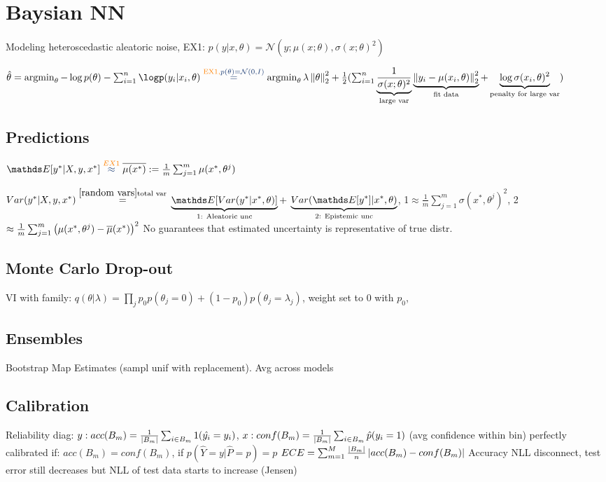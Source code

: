 \section{Baysian NN}
Modeling heteroscedastic aleatoric noise, \color{orange}EX1: $p(y|x,\theta) =
\mathcal{N}(y; \mu(x;\theta), \sigma(x; \theta)^{2})$ \color{black}

$\hat{\theta} = \argmin_\theta - \log p(\theta) - \sum_{i=1}^{n}\logp(y_{i}|x_{i},\theta)
\overset{\color{orange} \text{EX1}, \color{myblue} p(\theta)=\mathcal{N}(0,I)}{=}
\argmin_\theta \lambda \norm{\theta}_{2}^{2} +
\frac{1}{2} (\sum_{i=1}^{n} \underbrace{\frac{1}{\sigma(x;\theta)^{2}}}_{\text{large var}}
    \underbrace{\norm{y_{i}-\mu(x_{i},\theta)}^2_{2}}_{\text{fit data}}
 + \underbrace{\log \sigma(x_{i}, \theta)^{2}}_{\text{penalty for large var}})$

\subsection{Predictions}

$\E{y^{*}|X,y,x^{*}} \overset{\color{orange}EX1 \color{myblue}}{\approx}
\bar{\mu(x^{*})} := \frac{1}{m} \sum_{j=1}^{m}\mu(x^{*}, \theta^{j}) $

$Var(y^{*}|X,y,x^{*}) \overset{\ref{random vars} \text{total var}}{=}$
$\underbrace{\E {Var(y^{*}|x^{*},\theta)}}_{\text{1: Aleatoric unc}} +$
$\underbrace{Var(\E{y^{*}}|x^{*}, \theta)}_{\text{2: Epistemic unc}}$,
1$\approx \frac{1}{m} \sum_{j=1}^{m}\sigma(x^{*},\theta^{j})^{2}$,
2$\approx \frac{1}{m} \sum_{j=1}^{m}\left(\mu(x^{*},\theta^{j})-\overline{\mu}(x^{*})\right)^{2}$
No guarantees that estimated uncertainty is representative of true distr.

\subsection{Monte Carlo Drop-out}
VI with family: $q(\theta|\lambda) = \prod_{j} p_{0} p(\theta_{j} = 0) + (1-p_{0})
p(\theta_{j}=\lambda_{j})$,
weight set to 0 with $p_{0}$,

\subsection{Ensembles}
Bootstrap Map Estimates (sampl unif with replacement). Avg across models

\subsection{Calibration}
Reliability diag: $y: acc(B_{m}) = \frac{1}{\left\lvert B_{m}\right\rvert} \sum_{i \in B_{m}} 1 ({\hat{y_{i}}}=y_{i})$,
$x: conf(B_{m})= \frac{1}{\left\lvert B_{m}\right\rvert} \sum_{i \in B_{m}} \hat{p}(y_{i}=1)$ (avg confidence within bin)
perfectly calibrated if: $acc(B_{m})=conf(B_{m})$, if $p(\hat{Y}=y|\hat{P}=p)=p$
$ECE = \sum_{m=1}^{M}\frac{\left\lvert B_{m}\right\rvert}{n} \left\lvert acc(B_{m})-conf(B_{m})\right\rvert$
Accuracy NLL disconnect, test error still decreases but NLL of test data starts to increase (Jensen)


